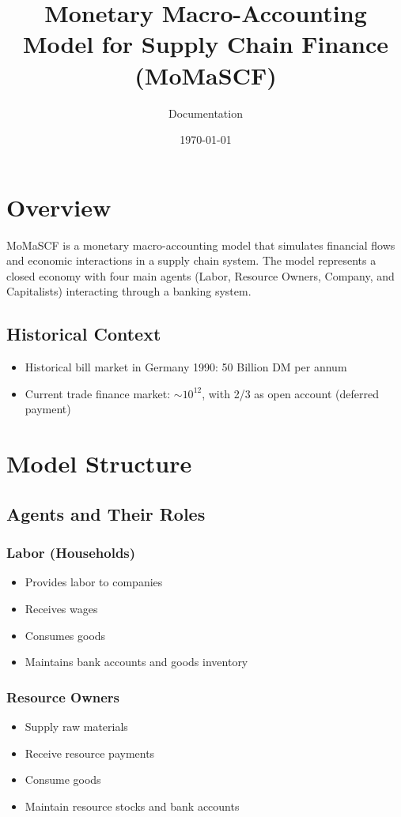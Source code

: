 \documentclass{article}
\title{Monetary Macro-Accounting Model for Supply Chain Finance (MoMaSCF)}
\author{Documentation}
\date{\today}
\begin{document}
\maketitle

\section{Overview}

MoMaSCF is a monetary macro-accounting model that simulates financial flows and economic interactions in a supply chain system. The model represents a closed economy with four main agents (Labor, Resource Owners, Company, and Capitalists) interacting through a banking system.

\subsection{Historical Context}
\begin{itemize}
    \item Historical bill market in Germany 1990: 50 Billion DM per annum
    \item Current trade finance market: $\sim 10^{12}$, with 2/3 as open account (deferred payment)
\end{itemize}

\section{Model Structure}

\subsection{Agents and Their Roles}

\subsubsection{Labor (Households)}
\begin{itemize}
    \item Provides labor to companies
    \item Receives wages
    \item Consumes goods
    \item Maintains bank accounts and goods inventory
\end{itemize}

\subsubsection{Resource Owners}
\begin{itemize}
    \item Supply raw materials
    \item Receive resource payments
    \item Consume goods
    \item Maintain resource stocks and bank accounts
\end{itemize}
\end{document}
